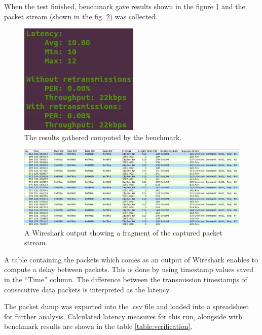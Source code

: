When the test finished, benchmark gave results shown in the figure 
\ref{fig:board_results} and the packet stream (shown in the fig. 
\ref{fig:verification_wireshark}) was collected.

\begin{figure}[H]
    \centering
    \includegraphics[scale=0.75]{images/one-hop-w-throughput.jpg}
    \caption{The results gathered computed by the benchmark.}
    \label{fig:board_results}
\end{figure}

\begin{figure}[H]
    \centering
    \includegraphics[scale=0.4]{images/packet-stream.jpg}
    \caption{A Wireshark output showing a fragment of the captured packet stream.}
    \label{fig:verification_wireshark}
\end{figure}

A table containing the packets which comes as an output of Wireshark enables
to compute a delay between packets. This is done by using timestamp values
saved in the ``Time'' column. The difference between the transmission 
timestamps of consecutive data packets is interpreted as the latency. 

The packet dump was exported into the .csv file and loaded into a spreadsheet 
for further analysis. Calculated latency measures for this run, alongside with
benchmark results are shown in the table \ref{table:verification}.

